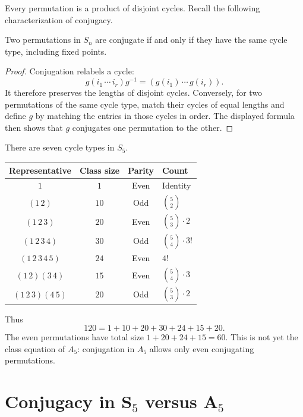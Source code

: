 \documentclass[reqno,11pt]{amsart}
\begin{document}
Every permutation is a product of disjoint cycles. Recall the following
characterization of conjugacy.

\begin{theorem}[Conjugacy in $S_n$]\label{thm:cycle-type}
Two permutations in $S_n$ are conjugate if and only if they have
the same cycle type, including fixed points.
\end{theorem}
\begin{proof}
Conjugation relabels a cycle:
\[
  g(i_1\,\cdots\,i_r)g^{-1}=(g(i_1)\,\cdots\,g(i_r)).
\]
It therefore preserves the lengths of disjoint cycles.
Conversely, for two permutations of the same cycle type, match
their cycles of equal lengths and define $g$ by matching the
entries in those cycles in order. The displayed formula then
shows that $g$ conjugates one permutation to the other.
\end{proof}

\begin{example}\label{ex:s5}
There are seven cycle types in $S_5$.
\begin{center}
\begin{tabular}{cccl}
  \textbf{Representative} & \textbf{Class size} & \textbf{Parity} & \textbf{Count}\\ \hline
  $1$ & $1$ & Even & Identity\\[2pt]
  $(1\,2)$ & $10$ & Odd & $\binom52$\\[2pt]
  $(1\,2\,3)$ & $20$ & Even & $\binom53\cdot2$\\[2pt]
  $(1\,2\,3\,4)$ & $30$ & Odd & $\binom54\cdot3!$\\[2pt]
  $(1\,2\,3\,4\,5)$ & $24$ & Even & $4!$\\[2pt]
  $(1\,2)(3\,4)$ & $15$ & Even & $\binom54\cdot3$\\[2pt]
  $(1\,2\,3)(4\,5)$ & $20$ & Odd & $\binom53\cdot2$
\end{tabular}
\end{center}
Thus
\[
  120=1+10+20+30+24+15+20.
\]
The even permutations have total size $1+20+24+15=60$.
This is not yet the class equation of $A_5$: conjugation in $A_5$
allows only even conjugating permutations.
\end{example}

\section{Conjugacy in S\texorpdfstring{$_5$}{5} versus A\texorpdfstring{$_5$}{5}}
\end{document}
